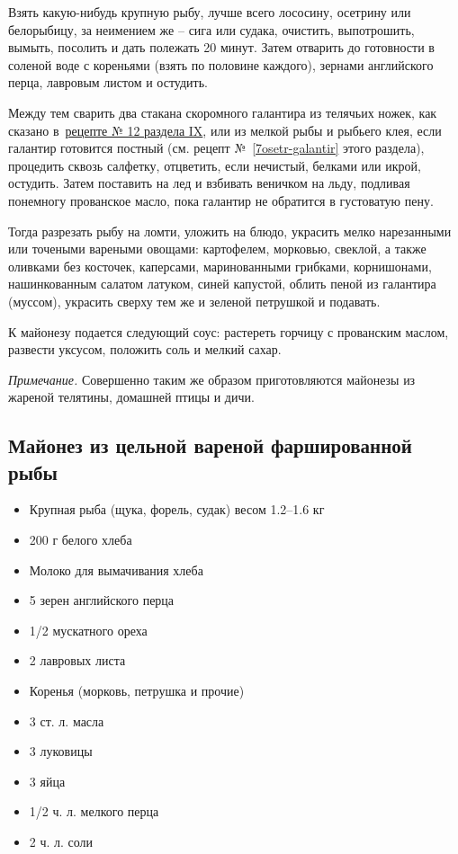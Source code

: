 Взять какую-нибудь крупную рыбу, лучше всего лососину, осетрину или белорыбицу, за неимением же – сига или судака, очистить, выпотрошить, вымыть, посолить и дать полежать 20 минут. Затем отварить до готовности в соленой воде с кореньями (взять по половине каждого), зернами английского перца, лавровым листом и остудить.

Между тем сварить два стакана скоромного галантира из телячьих ножек, как сказано в~\hyperref[12zalivnoje]{рецепте № 12 раздела IX}, или из мелкой рыбы и рыбьего клея, если галантир готовится постный (см. рецепт №~\ref{7osetr-galantir} этого раздела), процедить сквозь салфетку, отцветить, если нечистый, белками или икрой, остудить. Затем поставить на лед и взбивать веничком на льду, подливая понемногу прованское масло, пока галантир не обратится в густоватую пену.

Тогда разрезать рыбу на ломти, уложить на блюдо, украсить мелко нарезанными или точеными вареными овощами: картофелем, морковью, свеклой, а также оливками без косточек, каперсами, маринованными грибками, корнишонами, нашинкованным салатом латуком, синей капустой, облить пеной из галантира (муссом), украсить сверху тем же и зеленой петрушкой и подавать.

К майонезу подается следующий соус: растереть горчицу с прованским маслом, развести уксусом, положить соль и мелкий сахар.

\emph{Примечание.} Совершенно таким же образом приготовляются майонезы из жареной телятины, домашней птицы и дичи.

\subsection{Майонез из цельной вареной фаршированной рыбы}

\begin{itemize}
	\item Крупная рыба (щука, форель, судак) весом 1.2–1.6 кг
    \item 200 г белого хлеба 
    \item Молоко для вымачивания хлеба 
    \item 5 зерен английского перца
    \item 1/2 мускатного ореха 
    \item 2 лавровых листа 
    \item Коренья (морковь, петрушка и прочие) 
    \item 3 ст. л. масла 
    \item 3 луковицы 
    \item 3 яйца 
    \item 1/2 ч. л. мелкого перца 
    \item 2 ч. л. соли
\end{itemize}

